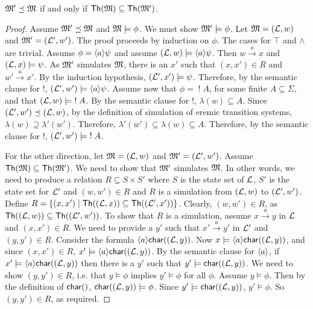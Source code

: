 \begin{theorem}\label{theorem:completeLattice}
$\frak{M}' \preceq \frak{M}$ if and only if
$\mathsf{Th}(\frak{M}) \subseteq  \mathsf{Th}(\frak{M}')$.
\end{theorem}

\begin{proof}
Assume $\frak{M}' \preceq \frak{M}$ and $\frak{M} \models \phi$.  We must show
$\frak{M}' \models \phi$.  Let $\frak{M} = (\mathcal{L}, w)$ and $\frak{M}' = (\mathcal{L}',
w')$.  The proof proceeds by induction on $\phi$.  The cases for
$\top$ and $\land$ are trivial.  Assume $\phi = \langle a \rangle \psi$ and
assume $(\mathcal{L}, w) \models \langle a \rangle \psi$.  Then $w \xrightarrow{a} x$
and $(\mathcal{L}, x) \models \psi$.  As $\frak{M}'$ simulates $\frak{M}$, there is
an $x'$ such that $(x,x') \in R$ and $w' \xrightarrow{a} x'$.  By the
induction hypothesis, $(\mathcal{L}', x') \models \psi$.  Therefore, by the
semantic clause for $!$, $(\mathcal{L}', w') \models \langle a \rangle \psi$.  Assume
now that $\phi = \; ! \; A$, for some finite $A \subseteq \Sigma$, and
that $(\mathcal{L}, w) \models \; ! \; A$.  By the semantic clause for $!$,
$\lambda(w) \subseteq A$.  Since $(\mathcal{L}', w') \preceq (\mathcal{L}, w)$, by
the definition of simulation of eremic transition systems, $\lambda(w)
\supseteq \lambda'(w')$.  Therefore, $\lambda'(w') \subseteq
\lambda(w) \subseteq A$.  Therefore, by the semantic clause for $!$,
$(\mathcal{L}', w') \models \; ! \; A$.

For the other direction, let $\frak{M} = (\mathcal{L}, w)$ and $\frak{M}' = (\mathcal{L}',
w')$.  Assume $\mathsf{Th}(\frak{M}) \subseteq \mathsf{Th}(\frak{M}') $. We need to
show that $\frak{M}'$ simulates $\frak{M}$.  In other words, we need to
produce a relation $R \subseteq S \times S'$ where $S$ is the state
set of $\mathcal{L}$, $S'$ is the state set for $\mathcal{L}'$ and $(w,w') \in R$
and $R$ is a simulation from $(\mathcal{L}, w)$ to $ (\mathcal{L}', w')$.  Define $R
= \{(x,x') \; | \; \mathsf{Th}( (\mathcal{L}, x)) \subseteq \mathsf{Th}( (\mathcal{L}',
  x'))\}$.  Clearly, $(w,w') \in R$, as $\mathsf{Th}((\mathcal{L}, w)) \subseteq
\mathsf{Th}((\mathcal{L}', w')) $.  To show that $R$ is a simulation, assume $x
\xrightarrow{a} y$ in $\mathcal{L}$ and $(x,x') \in R$. 
We need to provide a
$y'$ such that $x' \xrightarrow{a} y'$ in $\mathcal{L}'$ and $(y,y') \in R$.  
Consider the formula $\langle a \rangle \mathsf{char}((\mathcal{L}, y))$. 
Now $x \models \langle a \rangle \mathsf{char}((\mathcal{L}, y))$, and since $(x,x') \in R$, $x' \models \langle a \rangle \mathsf{char}((\mathcal{L}, y))$.
By the semantic clause for $\MAY{a}$, if $x' \models \langle a \rangle \mathsf{char}((\mathcal{L}, y))$ then there is a $y'$ such that 
$y' \models \mathsf{char}((\mathcal{L}, y))$.
We need to show $(y,y') \in R$, i.e. that $y \models \phi$ implies $y' \models \phi$ for all $\phi$.
Assume $y \models \phi$. 
Then by the definition of $\CHAR$, $\mathsf{char}((\mathcal{L}, y)) \models \phi$.
Since $y' \models \mathsf{char}((\mathcal{L}, y))$, $y' \models \phi$. 
So $(y,y') \in R$, as required.


\end{proof}
